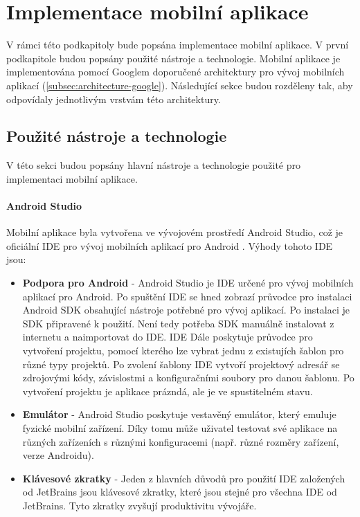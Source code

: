 \chapter{Implementace mobilní aplikace}
\setcounter{page}{1}
\label{ch:implementation}

V rámci této podkapitoly bude popsána implementace mobilní aplikace. V první podkapitole budou popsány použité nástroje a technologie. Mobilní aplikace je implementována pomocí Googlem doporučené architektury pro vývoj mobilních aplikací (\ref{subsec:architecture-google}). Následující sekce budou rozděleny tak, aby odpovídaly jednotlivým vrstvám této architektury.

\section{Použité nástroje a technologie}
V této sekci budou popsány hlavní nástroje a technologie použité pro implementaci mobilní aplikace.

\subsubsection *{Android Studio}
Mobilní aplikace byla vytvořena ve vývojovém prostředí Android Studio, což je oficiální IDE pro vývoj mobilních aplikací pro Android \cite{androidstudio}. Výhody tohoto IDE jsou:

\begin{itemize}
	\item \textbf{Podpora pro Android} - Android Studio je IDE určené pro vývoj mobilních aplikací pro Android. Po spuštění IDE se hned zobrazí průvodce pro instalaci Android SDK obsahující nástroje potřebné pro vývoj aplikací. Po instalaci je SDK připravené k použití. Není tedy potřeba SDK manuálně instalovat z internetu a naimportovat do IDE. IDE Dále poskytuje průvodce pro vytvoření projektu, pomocí kterého lze vybrat jednu z existujích šablon pro různé typy projektů. Po zvolení šablony IDE vytvoří projektový adresář se zdrojovými kódy, závislostmi a konfiguračními soubory pro danou šablonu. Po vytvoření projektu je aplikace prázndá, ale je ve spustitelném stavu.
	
	\item \textbf{Emulátor} - Android Studio poskytuje vestavěný emulátor, který emuluje fyzické mobilní zařízení. Díky tomu může uživatel testovat své aplikace na různých zařízeních s různými konfiguracemi (např. různé rozměry zařízení, verze Androidu).
		
	\item \textbf{Klávesové zkratky} - Jeden z hlavních důvodů pro použití IDE založených od JetBrains jsou klávesové zkratky, které jsou stejné pro všechna IDE od JetBrains. Tyto zkratky zvyšují produktivitu vývojáře.
\end{itemize}

